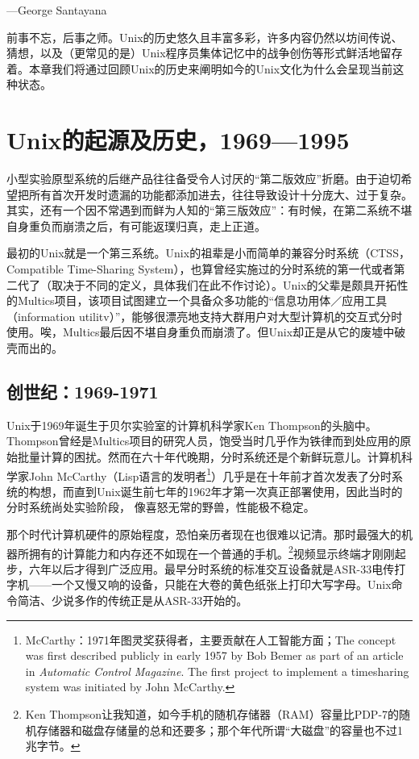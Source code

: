 \documentclass[12pt,oneside]{book}
\begin{document}
\begin{common-format}
\begin{flushright}
\begin{notecard}{17em}
{\hfill —George Santayana}
\end{notecard}
\end{flushright}

前事不忘，后事之师。Unix的历史悠久且丰富多彩，许多内容仍然以坊间传说、猜想，以及（更常见的是）Unix程序员集体记忆中的战争创伤等形式鲜活地留存着。本章我们将通过回顾Unix的历史来阐明如今的Unix文化为什么会呈现当前这种状态。

\section{Unix的起源及历史，1969—1995}
小型实验原型系统的后继产品往往备受令人讨厌的“第二版效应”折磨。由于迫切希望把所有首次开发时遗漏的功能都添加进去，往往导致设计十分庞大、过于复杂。其实，还有一个因不常遇到而鲜为人知的“第三版效应”：有时候，在第二系统不堪自身重负而崩溃之后，有可能返璞归真，走上正道。

最初的Unix就是一个第三系统。Unix的祖辈是小而简单的兼容分时系统（CTSS，Compatible Time-Sharing System），也算曾经实施过的分时系统的第一代或者第二代了（取决于不同的定义，具体我们在此不作讨论）。Unix的父辈是颇具开拓性的Multics项目，该项目试图建立一个具备众多功能的“信息功用体／应用工具（information utilitv）”，能够很漂亮地支持大群用户对大型计算机的交互式分时使用。唉，Multics最后因不堪自身重负而崩溃了。但Unix却正是从它的废墟中破壳而出的。

\subsection{创世纪：1969-1971}
Unix于1969年诞生于贝尔实验室的计算机科学家Ken Thompson的头脑中。Thompson曾经是Multics项目的研究人员，饱受当时几乎作为铁律而到处应用的原始批量计算的困扰。然而在六十年代晚期，分时系统还是个新鲜玩意儿。计算机科学家John McCarthy（Lisp语言的发明者\footnote{McCarthy：1971年图灵奖获得者，主要贡献在人工智能方面；The concept was first described publicly in early 1957 by Bob Bemer as part of an article in \textit{Automatic Control Magazine}.  The first project to implement a timesharing system was initiated by John McCarthy. }）几乎是在十年前才首次发表了分时系统的构想，而直到Unix诞生前七年的1962年才第一次真正部署使用，因此当时的分时系统尚处实验阶段，
像喜怒无常的野兽，性能极不稳定。

那个时代计算机硬件的原始程度，恐怕亲历者现在也很难以记清。那时最强大的机器所拥有的计算能力和内存还不如现在一个普通的手机。\footnote{Ken Thompson让我知道，如今手机的随机存储器（RAM）容量比PDP-7的随机存储器和磁盘存储量的总和还要多；那个年代所谓“大磁盘”的容量也不过1兆字节。}视频显示终端才刚刚起步，六年以后才得到广泛应用。最早分时系统的标准交互设备就是ASR-33电传打字机——一个又慢又响的设备，只能在大卷的黄色纸张上打印大写字母。Unix命令简洁、少说多作的传统正是从ASR-33开始的。


\end{common-format}
\end{document}
